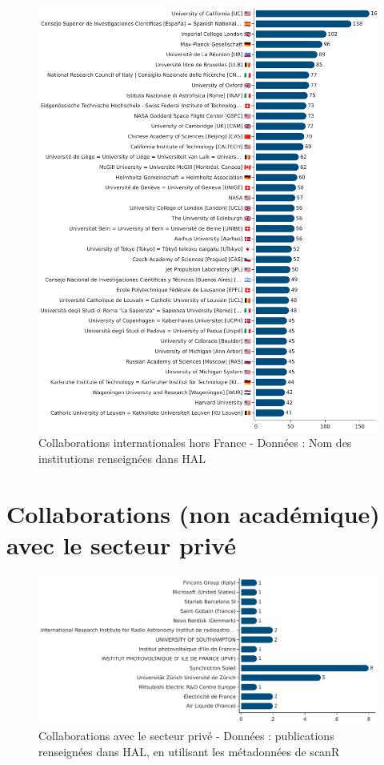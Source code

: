 \documentclass[french, 11pt]{dibiso/biso}
\begin{document}
\begin{figure}[!h]
  \includegraphics[width=\textwidth]{figures/collaboration_names.pdf}
  \caption{Collaborations internationales hors France - Données : Nom des institutions renseignées dans HAL}
  \label{fig_collab_names}
\end{figure}

{\footnotesize\collaborationnamesinfo}

\pagebreak

\section{Collaborations (non académique) avec le secteur privé}

\begin{figure}[!h]
  \includegraphics[width=\textwidth]{figures/private_sector_collaborations.pdf}
  \centering
  \caption{Collaborations avec le secteur privé - Données : publications renseignées dans HAL, en utilisant les métadonnées de scanR}
  \label{fig_private_collab}
\end{figure}
\end{document}
